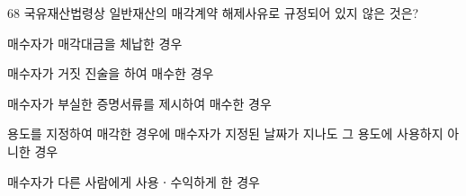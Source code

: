 \begin{question}{68}
국유재산법령상 일반재산의 매각계약 해제사유로 규정되어 있지 않은 것은?
\begin{choices}
  \item 매수자가 매각대금을 체납한 경우
  \item 매수자가 거짓 진술을 하여 매수한 경우
  \item 매수자가 부실한 증명서류를 제시하여 매수한 경우
  \item 용도를 지정하여 매각한 경우에 매수자가 지정된 날짜가 지나도 그 용도에 사용하지 아니한 경우
  \item 매수자가 다른 사람에게 사용ㆍ수익하게 한 경우
\end{choices}
\end{question}

